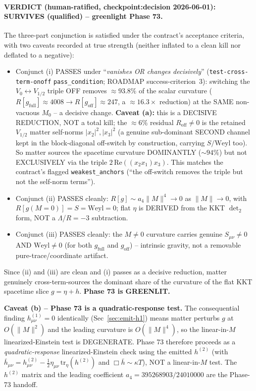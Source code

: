 \paragraph{VERDICT (human-ratified, checkpoint:decision 2026-06-01): SURVIVES (qualified)
-- greenlight Phase 73.} The three-part conjunction is satisfied under the contract's
acceptance criteria, with two caveats recorded at true strength (neither inflated to a
clean kill nor deflated to a negative):
\begin{itemize}
  \item Conjunct (i) PASSES under ``\emph{vanishes OR changes decisively}''
        (\texttt{test-cross-term-onoff} \texttt{pass\_condition}; ROADMAP
        success-criterion~3): switching the $V_0\!\leftrightarrow\!V_{1/2}$ triple OFF
        removes $\approx93.8\%$ of the scalar curvature ($R[g_{\mathrm{full}}]\approx4008
        \to R[g_{\mathrm{off}}]\approx247$, a $\approx16.3\times$ reduction) at the SAME
        non-vacuous $M_0$ -- a decisive change. \textbf{Caveat (a):} this is a DECISIVE
        REDUCTION, NOT a total kill; the $\approx6\%$ residual $R_{\mathrm{off}}\neq0$ is
        the retained $V_{1/2}$ matter self-norms $|x_2|^2,|x_3|^2$ (a genuine sub-dominant
        SECOND channel kept in the block-diagonal off-switch by construction, carrying
        $S/\mathrm{Weyl}$ too). So matter sources the spacetime curvature DOMINANTLY
        ($\sim94\%$) but not EXCLUSIVELY via the triple $2\,\mathrm{Re}((x_2x_1)x_3)$. This
        matches the contract's flagged \texttt{weakest\_anchors} (``the off-switch removes
        the triple but not the self-norm terms'').
  \item Conjunct (ii) PASSES cleanly: $R[g]\sim a_4\|M\|^4\to0$ as $\|M\|\to0$, with
        $R[g(M{=}0)]=S=\mathrm{Weyl}=0$; flat $\eta$ is DERIVED from the KKT $\det_2$ form,
        NOT a $\Lambda$/$R=-3$ subtraction.
  \item Conjunct (iii) PASSES cleanly: the $M\neq0$ curvature carries genuine
        $S_{\mu\nu}\neq0$ AND $\mathrm{Weyl}\neq0$ (for both $g_{\mathrm{full}}$ and
        $g_{\mathrm{off}}$) -- intrinsic gravity, not a removable pure-trace/coordinate
        artifact.
\end{itemize}
Since (ii) and (iii) are clean and (i) passes as a decisive reduction, matter genuinely
cross-term-sources the dominant share of the curvature of the flat KKT spacetime slice
$g=\eta+h$. \textbf{Phase 73 is GREENLIT.}

\textbf{Caveat (b) -- Phase 73 is a quadratic-response test.} The consequential finding
$h^{(1)}_{\mu\nu}=0$ identically (Sec~\ref{sec:emit-h1}) means matter perturbs $g$ at
$O(\|M\|^2)$ and the leading curvature is $O(\|M\|^4)$, so the linear-in-$M$
linearized-Einstein test is DEGENERATE. Phase 73 therefore proceeds as a
\emph{quadratic-response} linearized-Einstein check using the emitted $h^{(2)}$ (with
$\bar h_{\mu\nu}=h^{(2)}_{\mu\nu}-\tfrac12\eta_{\mu\nu}\,\mathrm{tr}_\eta(h^{(2)})$ and
$\Box\bar h\sim\kappa T$), NOT a linear-in-$M$ test. The $h^{(2)}$ matrix and the leading
coefficient $a_4=395268903/24010000$ are the Phase-73 handoff.

